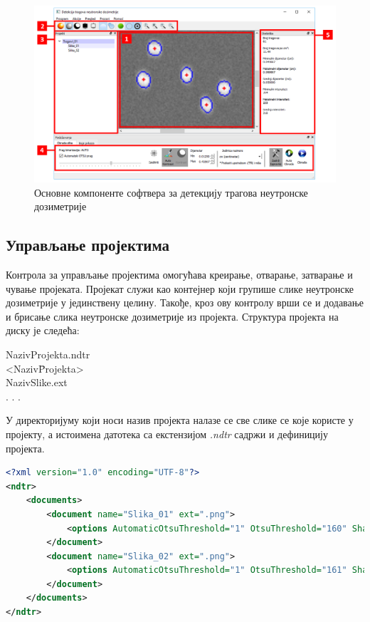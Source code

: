 \documentclass[11pt,a4paper,serbian,oneside]{book}
\begin{document}
\begin{figure}[H]
\begin{center}
\includegraphics[width=150mm]{images/softver2.PNG}
\end{center}
\caption{Основне компоненте софтвера за детекцију трагова неутронске дозиметрије}
\label{fig:softver2}
\end{figure}

\subsection{Управљање пројектима}

Контрола за управљање пројектима омогућава креирање, отварање, затварање и чување пројеката.
Пројекат служи као контејнер који групише слике неутронске дозиметрије у јединствену целину.
Такође, кроз ову контролу врши се и додавање и брисање слика неутронске дозиметрије из пројекта. Структура пројекта на диску је следећа:

\begin{tabbing}
NazivProjekta.ndtr \\
<Naziv\= Projekta>   \\
\>    NazivSlike.ext \\
\>    . . . \\
\end{tabbing}

У директоријуму који носи назив пројекта налазе се све слике се које користе у пројекту, а истоимена датотека са екстензијом \textit{.ndtr} садржи и дефиницију пројекта.

\begin{lstlisting}[language=Xml,label=lst:Project,caption=Пример дефиниције пројекта]
<?xml version="1.0" encoding="UTF-8"?>
<ndtr>
    <documents>
        <document name="Slika_01" ext=".png">
            <options AutomaticOtsuThreshold="1" OtsuThreshold="160" Sharpen="0" WoB="1" MinTraceDiameter="5" MaxTraceDiameter="40"/>
        </document>
        <document name="Slika_02" ext=".png">
            <options AutomaticOtsuThreshold="1" OtsuThreshold="161" Sharpen="0" WoB="1" MinTraceDiameter="5" MaxTraceDiameter="40"/>
        </document>
    </documents>
</ndtr>
\end{lstlisting}
\end{document}
